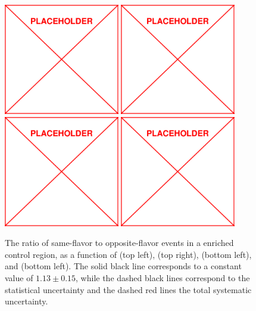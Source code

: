 \begin{figure}
	\centering
	\includegraphics[width=0.45\textwidth]{figs/placeholder}
	\includegraphics[width=0.45\textwidth]{figs/placeholder}
	\includegraphics[width=0.45\textwidth]{figs/placeholder}
	\includegraphics[width=0.45\textwidth]{figs/placeholder}
	\caption{The ratio of same-flavor to opposite-flavor events in a \ttbar enriched control region, as a function of \nj (top left), \nb (top right), \HT (bottom left), and \mttwo (bottom left). The solid black line corresponds to a constant value of $1.13 \pm 0.15$, while the dashed black lines correspond to the statistical uncertainty and the dashed red lines the total systematic uncertainty.}
	\label{fig:rsfof}
\end{figure}
